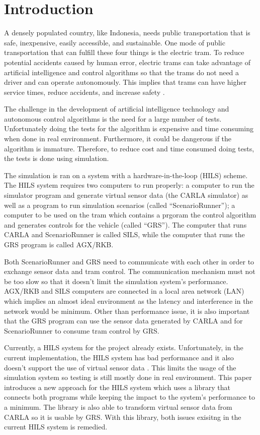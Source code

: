 \section{Introduction}

A densely populated country, like Indonesia, needs public transportation that is
safe, inexpensive, easily accessible, and sustainable. One mode of public
transportation that can fulfill these four things is the electric tram. To
reduce potential accidents caused by human error, electric trams can take
advantage of artificial intelligence and control algorithms so that the trams do
not need a driver and can operate autonomously. This implies that trams can have
higher service times, reduce accidents, and increase safety
\cite{trilaksono_laporanRispro}.

The challenge in the development of artificial intelligence technology and
autonomous control algorithms is the need for a large number of tests.
Unfortunately doing the tests for the algorithm is expensive and time consuming
when done in real environment. Furthermore, it could be dangerous if the
algorithm is immature. Therefore, to reduce cost and time consumed doing tests,
the tests is done using simulation.

The simulation is ran on a system with a hardware-in-the-loop (HILS) scheme. The
HILS system requires two computers to run properly: a computer to run the
simulator program and generate virtual sensor data (the CARLA simulator) as well
as a program to run simulation scenarios (called ``ScenarioRunner''); a computer
to be used on the tram which contains a prgoram the control algorithm and
generates controls for the vehicle (called ``GRS''). The computer that runs
CARLA and ScenarioRunner is called SILS, while the computer that runs the GRS
program is called AGX/RKB.

Both ScenarioRunner and GRS need to communicate with each other in order to
exchange sensor data and tram control. The communication mechanism must not be
too slow so that it doesn't limit the simulation system's performance. AGX/RKB
and SILS computers are connected in a local area network (LAN) which implies an
almost ideal environment as the latency and interference in the network would be
minimum. Other than performance issue, it is also important that the GRS program
can use the sensor data generated by CARLA and for ScenarioRunner to consume
tram control by GRS.

Currently, a HILS system for the project already exists. Unfortunately, in the
current implementation, the HILS system has bad performance and it also doesn't
support the use of virtual sensor data \cite{trilaksono_laporanRispro}. This
limits the usage of the simulation system so testing is still mostly done in
real environment. This paper introduces a new approach for the HILS system which
uses a library that connects both programs while keeping the impact to the
system's performance to a minimum. The library is also able to transform virtual
sensor data from CARLA so it is usable by GRS.  With this library, both issues
exisitng in the current HILS system is remedied.
